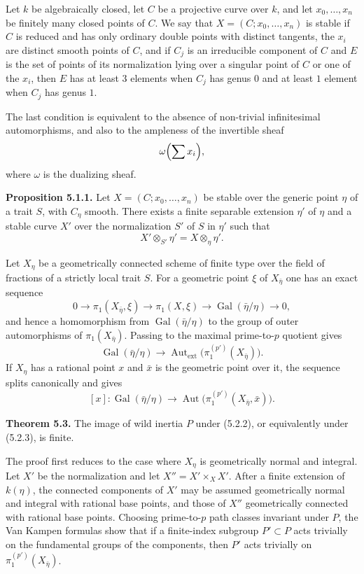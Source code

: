 \documentclass[11pt]{article}
\providecommand{\Gal}{\operatorname{Gal}}
\providecommand{\Aut}{\operatorname{Aut}}
\begin{document}
Let $k$ be algebraically closed, let $C$ be a projective curve over $k$, and let $x_0,\ldots,x_n$ be finitely many closed points of $C$. We say that $X=(C;x_0,\ldots,x_n)$ is stable if $C$ is reduced and has only ordinary double points with distinct tangents, the $x_i$ are distinct smooth points of $C$, and if $C_j$ is an irreducible component of $C$ and $E$ is the set of points of its normalization lying over a singular point of $C$ or one of the $x_i$, then $E$ has at least $3$ elements when $C_j$ has genus $0$ and at least $1$ element when $C_j$ has genus $1$.

The last condition is equivalent to the absence of non-trivial infinitesimal automorphisms, and also to the ampleness of the invertible sheaf
\[
 \omega\Bigl(\sum x_i\Bigr),
\]
where $\omega$ is the dualizing sheaf.

\textbf{Proposition 5.1.1.} Let $X=(C;x_0,\ldots,x_n)$ be stable over the generic point $\eta$ of a trait $S$, with $C_\eta$ smooth. There exists a finite separable extension $\eta'$ of $\eta$ and a stable curve $X'$ over the normalization $S'$ of $S$ in $\eta'$ such that
\[
 X'\otimes_{S'}\eta'=X\otimes_\eta\eta'.
\]

Let $X_\eta$ be a geometrically connected scheme of finite type over the field of fractions of a strictly local trait $S$. For a geometric point $\xi$ of $X_{\bar\eta}$ one has an exact sequence
\[
0\to \pi_1(X_{\bar\eta},\xi)\to \pi_1(X,\xi)\to\Gal(\bar\eta/\eta)\to0,
\tag{5.2.1}
\]
and hence a homomorphism from $\Gal(\bar\eta/\eta)$ to the group of outer automorphisms of $\pi_1(X_{\bar\eta})$. Passing to the maximal prime-to-$p$ quotient gives
\[
\Gal(\bar\eta/\eta)\to \Aut_{\mathrm{ext}}\bigl(\pi_1^{(p')}(X_{\bar\eta})\bigr).
\tag{5.2.2}
\]
If $X_\eta$ has a rational point $x$ and $\bar x$ is the geometric point over it, the sequence splits canonically and gives
\[
[x]:\Gal(\bar\eta/\eta)\to \Aut\bigl(\pi_1^{(p')}(X_{\bar\eta},\bar x)\bigr).
\tag{5.2.3}
\]

\textbf{Theorem 5.3.} The image of wild inertia $P$ under (5.2.2), or equivalently under (5.2.3), is finite.

The proof first reduces to the case where $X_\eta$ is geometrically normal and integral. Let $X'$ be the normalization and let $X''=X'\times_X X'$. After a finite extension of $k(\eta)$, the connected components of $X'$ may be assumed geometrically normal and integral with rational base points, and those of $X''$ geometrically connected with rational base points. Choosing prime-to-$p$ path classes invariant under $P$, the Van Kampen formulas show that if a finite-index subgroup $P'\subset P$ acts trivially on the fundamental groups of the components, then $P'$ acts trivially on $\pi_1^{(p')}(X_{\bar\eta})$.
\end{document}
